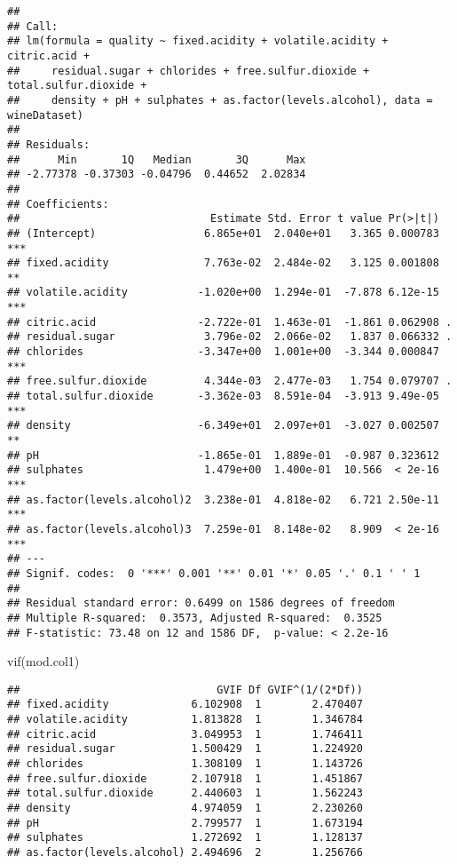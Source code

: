 \documentclass[
]{article}
\newenvironment{Shaded}{\begin{snugshade}}{\end{snugshade}}
\newcommand{\FunctionTok}[1]{\textcolor[rgb]{0.00,0.00,0.00}{#1}}
\newcommand{\NormalTok}[1]{#1}
\begin{document}
\begin{verbatim}
## 
## Call:
## lm(formula = quality ~ fixed.acidity + volatile.acidity + citric.acid + 
##     residual.sugar + chlorides + free.sulfur.dioxide + total.sulfur.dioxide + 
##     density + pH + sulphates + as.factor(levels.alcohol), data = wineDataset)
## 
## Residuals:
##      Min       1Q   Median       3Q      Max 
## -2.77378 -0.37303 -0.04796  0.44652  2.02834 
## 
## Coefficients:
##                              Estimate Std. Error t value Pr(>|t|)    
## (Intercept)                 6.865e+01  2.040e+01   3.365 0.000783 ***
## fixed.acidity               7.763e-02  2.484e-02   3.125 0.001808 ** 
## volatile.acidity           -1.020e+00  1.294e-01  -7.878 6.12e-15 ***
## citric.acid                -2.722e-01  1.463e-01  -1.861 0.062908 .  
## residual.sugar              3.796e-02  2.066e-02   1.837 0.066332 .  
## chlorides                  -3.347e+00  1.001e+00  -3.344 0.000847 ***
## free.sulfur.dioxide         4.344e-03  2.477e-03   1.754 0.079707 .  
## total.sulfur.dioxide       -3.362e-03  8.591e-04  -3.913 9.49e-05 ***
## density                    -6.349e+01  2.097e+01  -3.027 0.002507 ** 
## pH                         -1.865e-01  1.889e-01  -0.987 0.323612    
## sulphates                   1.479e+00  1.400e-01  10.566  < 2e-16 ***
## as.factor(levels.alcohol)2  3.238e-01  4.818e-02   6.721 2.50e-11 ***
## as.factor(levels.alcohol)3  7.259e-01  8.148e-02   8.909  < 2e-16 ***
## ---
## Signif. codes:  0 '***' 0.001 '**' 0.01 '*' 0.05 '.' 0.1 ' ' 1
## 
## Residual standard error: 0.6499 on 1586 degrees of freedom
## Multiple R-squared:  0.3573, Adjusted R-squared:  0.3525 
## F-statistic: 73.48 on 12 and 1586 DF,  p-value: < 2.2e-16
\end{verbatim}

\begin{Shaded}
\begin{Highlighting}[]
\FunctionTok{vif}\NormalTok{(mod.col1)}
\end{Highlighting}
\end{Shaded}

\begin{verbatim}
##                               GVIF Df GVIF^(1/(2*Df))
## fixed.acidity             6.102908  1        2.470407
## volatile.acidity          1.813828  1        1.346784
## citric.acid               3.049953  1        1.746411
## residual.sugar            1.500429  1        1.224920
## chlorides                 1.308109  1        1.143726
## free.sulfur.dioxide       2.107918  1        1.451867
## total.sulfur.dioxide      2.440603  1        1.562243
## density                   4.974059  1        2.230260
## pH                        2.799577  1        1.673194
## sulphates                 1.272692  1        1.128137
## as.factor(levels.alcohol) 2.494696  2        1.256766
\end{verbatim}
\end{document}
